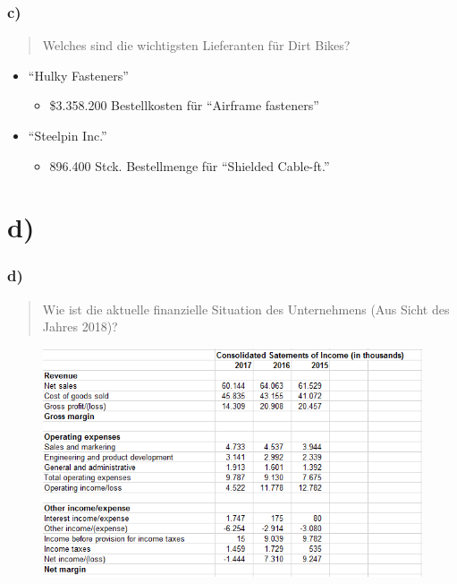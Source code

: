\documentclass{beamer}
\begin{document}
\begin{frame}
\frametitle{c)}

\begin{quote}
Welches sind die wichtigsten Lieferanten für Dirt Bikes?
\end{quote}

\begin{itemize}
\setlength{\itemsep}{14pt}
\item ``Hulky Fasteners''
\begin{itemize}
\item \$3.358.200 Bestellkosten f\"ur ``Airframe fasteners''
\end{itemize}
\item ``Steelpin Inc.''
\begin{itemize}
\item 896.400 Stck. Bestellmenge f\"ur ``Shielded Cable-ft.''
\end{itemize}
\end{itemize}

\end{frame}

\section{d)}
\begin{frame}
\frametitle{d)}

\begin{quote}
Wie ist die aktuelle finanzielle Situation des Unternehmens (Aus Sicht des Jahres 2018)?
\end{quote}

\begin{figure}
\includegraphics[scale=0.5]{financials.PNG}
\end{figure}

\end{frame}
\end{document}
